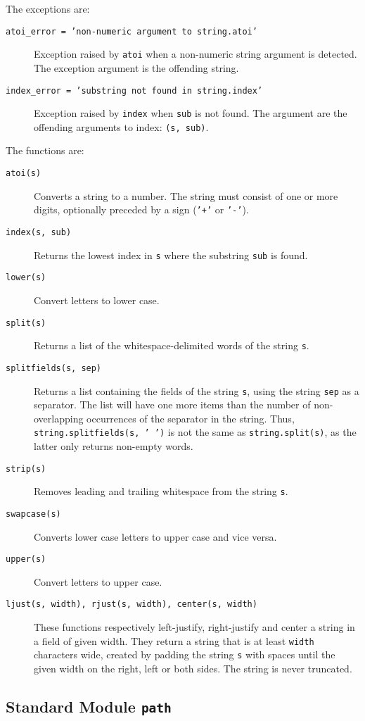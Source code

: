 The exceptions are:
\begin{description}
\item[{\tt atoi\_error = 'non-numeric argument to string.atoi'}]
Exception raised by
{\tt atoi}
when a non-numeric string argument is detected.
The exception argument is the offending string.
\item[{\tt index\_error = 'substring not found in string.index'}]
Exception raised by
{\tt index}
when
{\tt sub}
is not found.
The argument are the offending arguments to index: {\tt (s, sub)}.
\end{description}

The functions are:
\begin{description}
\item[{\tt atoi(s)}]
Converts a string to a number.
The string must consist of one or more digits, optionally preceded by a
sign ({\tt '+'} or {\tt '-'}).
\item[{\tt index(s, sub)}]
Returns the lowest index in
{\tt s}
where the substring
{\tt sub}
is found.
\item[{\tt lower(s)}]
Convert letters to lower case.
\item[{\tt split(s)}]
Returns a list of the whitespace-delimited words of the string
{\tt s}.
\item[{\tt splitfields(s, sep)}]
Returns a list containing the fields of the string
{\tt s},
using the string
{\tt sep}
as a separator.
The list will have one more items than the number of non-overlapping
occurrences of the separator in the string.
Thus,
{\tt string.splitfields(s, ' ')}
is not the same as
{\tt string.split(s)},
as the latter only returns non-empty words.
\item[{\tt strip(s)}]
Removes leading and trailing whitespace from the string
{\tt s}.
\item[{\tt swapcase(s)}]
Converts lower case letters to upper case and vice versa.
\item[{\tt upper(s)}]
Convert letters to upper case.
\item[{\tt ljust(s, width), rjust(s, width),  center(s, width)}]
These functions respectively left-justify, right-justify and center a
string in a field of given width.
They return a string that is at least
{\tt width}
characters wide, created by padding the string
{\tt s}
with spaces until the given width on the right, left or both sides.
The string is never truncated.
\end{description}

\subsection{Standard Module {\tt path}}

